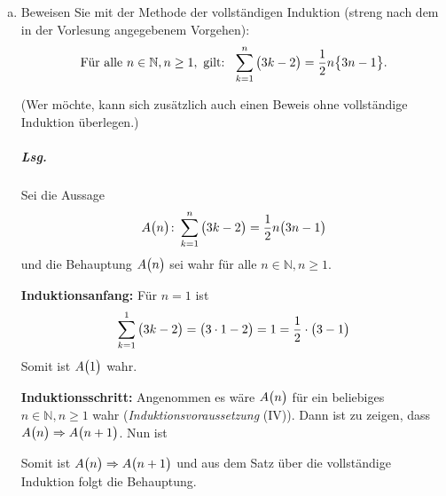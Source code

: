 \documentclass{scrreprt}
\begin{document}
\begin{enumerate}[(a)]
\newpage
\item Beweisen Sie mit der Methode der vollständigen Induktion (streng nach dem
  in der Vorlesung angegebenem Vorgehen):
  \[
    \text{Für alle } n \in \mathbb{N}, n \geq 1,
    \text{ gilt: }\;
    \sum_{k = 1}^n \qty\big(3k - 2) = \frac{1}{2}n\qty\big{3n - 1}.
  \]
  \begin{small}
    (Wer möchte, kann sich zusätzlich auch einen Beweis ohne vollständige
    Induktion überlegen.)
  \end{small}

  \subparagraph{Lsg.} Sei die Aussage
  \[
    A\qty\big(n) \colon \sum_{k = 1}^n \qty\big(3k - 2) = \frac{1}{2}n\qty\big(3n - 1)
  \]
  und die Behauptung $A\qty\big(n)$ sei wahr für alle
  $n \in \mathbb{N}, n \geq 1$.

  \textbf{Induktionsanfang:} Für $n = 1$ ist
  \[
    \sum_{k = 1}^1 \qty\big(3k - 2) = \qty\big(3 \cdot 1 - 2) = 1 = \frac{1}{2} \cdot \qty\big(3 - 1)
  \]
  Somit ist $A\qty\big(1)$ wahr.

  \textbf{Induktionsschritt:} Angenommen es wäre $A\qty\big(n)$ für ein
  beliebiges $n \in \mathbb{N}, n \geq 1$ wahr
  (\emph{Induktionsvoraussetzung} (IV)).
  Dann ist zu zeigen, dass $A\qty\big(n) \Rightarrow A\qty\big(n + 1)$.
  Nun ist
  Somit ist $A\qty\big(n) \Rightarrow A\qty\big(n + 1)$ und aus dem Satz über
  die vollständige Induktion folgt die Behauptung.


\end{enumerate}
\end{document}
